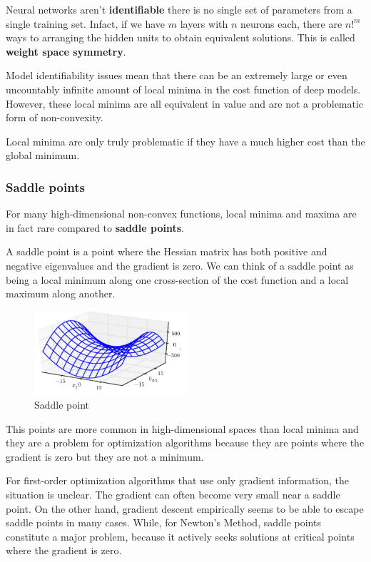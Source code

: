 Neural networks aren't \textbf{identifiable} there is no single set of parameters
from a single training set. Infact, if we have $m$ layers with $n$ neurons each,
there are $n!^m$ ways to arranging the hidden units to obtain equivalent solutions.
This is called \textbf{weight space symmetry}.

Model identifiability issues mean that there can be an extremely large or even
uncountably infinite amount of local minima in the cost function of deep models.
However, these local minima are all equivalent in value and are not a problematic
form of non-convexity.

Local minima are only truly problematic if they have a much higher cost than the
global minimum.
\subsubsection{Saddle points}
For many high-dimensional non-convex functions, local minima and maxima are in
fact rare compared to \textbf{saddle points}.

A saddle point is a point where the Hessian matrix has both positive and negative
eigenvalues and the gradient is zero. We can think of a saddle point as being a
local minimum along one cross-section of the cost function and a local maximum
along another.

\begin{figure}[!ht]
    \centering
    \includegraphics[width=0.5\textwidth]{img/saddle.png}
    \caption{Saddle point}
    \label{fig:saddle}
\end{figure}

This points are more common in high-dimensional spaces than local minima and they
are a problem for optimization algorithms because they are points where the gradient
is zero but they are not a minimum.

For first-order optimization algorithms that use only gradient information, the
situation is unclear. The gradient can often become very small near a saddle point.
On the other hand, gradient descent empirically seems to be able to escape saddle
points in many cases. While, for Newton's Method, saddle points constitute a
major problem, because it actively seeks solutions at critical points where the
gradient is zero.
